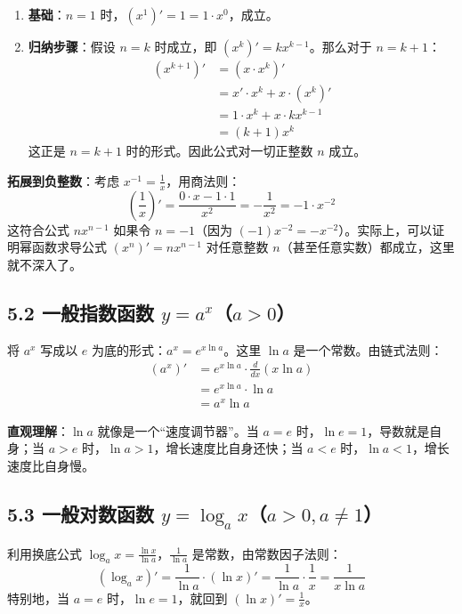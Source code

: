 \documentclass[10pt]{article}
\begin{document}
\begin{enumerate}
    \item \textbf{基础}：$n=1$ 时，$(x^1)' = 1 = 1 \cdot x^{0}$，成立。
    \item \textbf{归纳步骤}：假设 $n=k$ 时成立，即 $(x^k)' = k x^{k-1}$。那么对于 $n=k+1$：
    \[
    \begin{aligned}
    (x^{k+1})' &= (x \cdot x^k)' \\
    &= x' \cdot x^k + x \cdot (x^k)' \\
    &= 1 \cdot x^k + x \cdot k x^{k-1} \\
    &= (k+1)x^k
    \end{aligned}
    \]
    这正是 $n=k+1$ 时的形式。因此公式对一切正整数 $n$ 成立。
\end{enumerate}

\textbf{拓展到负整数}：考虑 $x^{-1} = \frac{1}{x}$，用商法则：
\[
\left(\frac{1}{x}\right)' = \frac{0 \cdot x - 1 \cdot 1}{x^2} = -\frac{1}{x^2} = -1 \cdot x^{-2}
\]
这符合公式 $n x^{n-1}$ 如果令 $n = -1$（因为 $(-1)x^{-2} = -x^{-2}$）。实际上，可以证明幂函数求导公式 $(x^n)' = n x^{n-1}$ 对任意整数 $n$（甚至任意实数）都成立，这里就不深入了。

\subsection*{5.2 一般指数函数 $y = a^x$（$a>0$）}
将 $a^x$ 写成以 $e$ 为底的形式：$a^x = e^{x \ln a}$。这里 $\ln a$ 是一个常数。由链式法则：
\[
\begin{aligned}
(a^x)' &= e^{x \ln a} \cdot \frac{d}{dx}(x \ln a) \\
&= e^{x \ln a} \cdot \ln a \\
&= a^x \ln a
\end{aligned}
\]

\textbf{直观理解}：$\ln a$ 就像是一个“速度调节器”。当 $a = e$ 时，$\ln e = 1$，导数就是自身；当 $a > e$ 时，$\ln a > 1$，增长速度比自身还快；当 $a < e$ 时，$\ln a < 1$，增长速度比自身慢。

\subsection*{5.3 一般对数函数 $y = \log_a x$（$a>0, a\neq1$）}
利用换底公式 $\log_a x = \frac{\ln x}{\ln a}$，$\frac{1}{\ln a}$ 是常数，由常数因子法则：
\[
(\log_a x)' = \frac{1}{\ln a} \cdot (\ln x)' = \frac{1}{\ln a} \cdot \frac{1}{x} = \frac{1}{x \ln a}
\]
特别地，当 $a = e$ 时，$\ln e = 1$，就回到 $(\ln x)' = \frac{1}{x}$。
\end{document}
